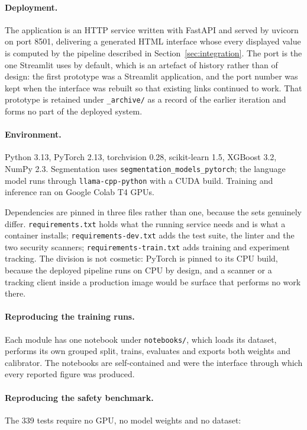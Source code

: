 \paragraph{Deployment.} The application is an HTTP service written with FastAPI and served
by uvicorn on port 8501, delivering a generated HTML interface whose every displayed value
is computed by the pipeline described in Section~\ref{sec:integration}. The port is the one
Streamlit uses by default, which is an artefact of history rather than of design: the first
prototype was a Streamlit application, and the port number was kept when the interface was
rebuilt so that existing links continued to work. That prototype is retained under
\texttt{\_archive/} as a record of the earlier iteration and forms no part of the deployed
system.

\paragraph{Environment.} Python 3.13, PyTorch 2.13, torchvision 0.28, scikit-learn 1.5,
XGBoost 3.2, NumPy 2.3. Segmentation uses \texttt{segmentation\_models\_pytorch}; the language
model runs through \texttt{llama-cpp-python} with a CUDA build. Training and inference ran on
Google Colab T4 GPUs.

Dependencies are pinned in three files rather than one, because the sets genuinely differ.
\texttt{requirements.txt} holds what the running service needs and is what a container
installs; \texttt{requirements-dev.txt} adds the test suite, the linter and the two security
scanners; \texttt{requirements-train.txt} adds training and experiment tracking. The division
is not cosmetic: PyTorch is pinned to its CPU build, because the deployed pipeline runs on CPU
by design, and a scanner or a tracking client inside a production image would be surface that
performs no work there.

\paragraph{Reproducing the training runs.} Each module has one notebook under
\texttt{notebooks/}, which loads its dataset, performs its own grouped split, trains, evaluates
and exports both weights and calibrator. The notebooks are self-contained and were the interface
through which every reported figure was produced.

\paragraph{Reproducing the safety benchmark.} The 339 tests require no GPU, no model weights and
no dataset:

